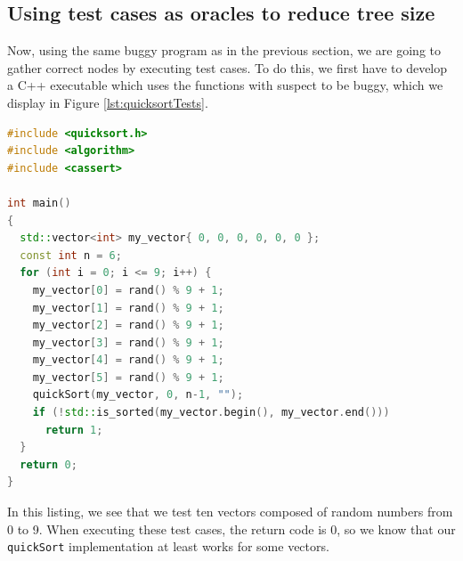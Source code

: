 \subsection{Using test cases as oracles to reduce tree size}
Now, using the same buggy program as in the previous section, we are going to gather correct nodes by executing test cases.
To do this, we first have to develop a C++ executable which uses the functions with suspect to be buggy, which we display in Figure \ref{lst:quicksortTests}.
\begin{lstlisting}[language=C++, caption=Test cases for quickSort, frame=tb, label={lst:quicksortTests}]
#include <quicksort.h>
#include <algorithm>
#include <cassert>

int main()
{
  std::vector<int> my_vector{ 0, 0, 0, 0, 0, 0 };
  const int n = 6;
  for (int i = 0; i <= 9; i++) {
    my_vector[0] = rand() % 9 + 1;
    my_vector[1] = rand() % 9 + 1;
    my_vector[2] = rand() % 9 + 1;
    my_vector[3] = rand() % 9 + 1;
    my_vector[4] = rand() % 9 + 1;
    my_vector[5] = rand() % 9 + 1;
    quickSort(my_vector, 0, n-1, "");
    if (!std::is_sorted(my_vector.begin(), my_vector.end()))
      return 1;
  }
  return 0;
}
\end{lstlisting}
In this listing, we see that we test ten vectors composed of random numbers from 0 to 9. When executing these test cases, the return code is 0, so we know that our \verb|quickSort| implementation at least works for some vectors.


